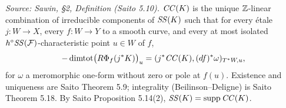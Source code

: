 \begin{definition}
  \label{def:sawin_characteristic_cycle}
  \textit{Source: Sawin, §2, Definition (Saito 5.10).}
  $\mathit{CC}(K)$ is the unique $\mathbb{Z}$-linear combination of irreducible components of
  $\mathit{SS}(K)$ such that for every étale $j:W\to X$, every $f:W\to Y$ to a smooth
  curve, and every at most isolated $h^\circ \mathit{SS}(\mathcal{F})$-characteristic point
  $u\in W$ of $f$,
  \[ -\operatorname{dimtot}\bigl(R\Phi_f(j^*K)\bigr)_u = (j^*\mathit{CC}(K),(df)^*\omega)_{T^*W,u}, \]
  for $\omega$ a meromorphic one-form without zero or pole at $f(u)$.  Existence
  and uniqueness are Saito Theorem 5.9; integrality (Beilinson--Deligne) is Saito
  Theorem 5.18.  By Saito Proposition 5.14(2), $\mathit{SS}(K) = \operatorname{supp}\mathit{CC}(K)$.
\end{definition}
